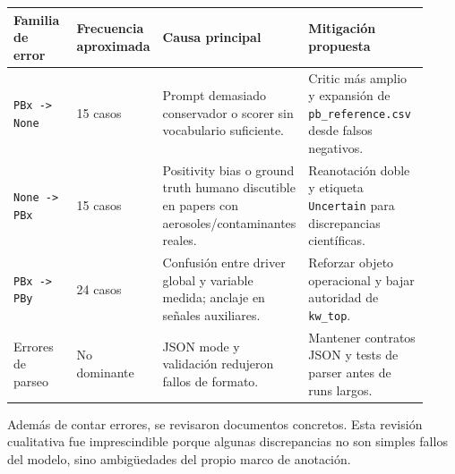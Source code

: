 \begin{center}
\scriptsize
\setlength{\tabcolsep}{4pt}
\renewcommand{\arraystretch}{1.18}
\begin{tabular}{p{0.18\linewidth}p{0.17\linewidth}p{0.25\linewidth}p{0.32\linewidth}}
\toprule
Familia de error & Frecuencia aproximada & Causa principal & Mitigación propuesta \\
\midrule
\texttt{PBx -> None} & 15 casos & Prompt demasiado conservador o scorer sin vocabulario suficiente. & Critic más amplio y expansión de \texttt{pb\_reference.csv} desde falsos negativos. \\
\texttt{None -> PBx} & 15 casos & Positivity bias o ground truth humano discutible en papers con aerosoles/contaminantes reales. & Reanotación doble y etiqueta \texttt{Uncertain} para discrepancias científicas. \\
\texttt{PBx -> PBy} & 24 casos & Confusión entre driver global y variable medida; anclaje en señales auxiliares. & Reforzar objeto operacional y bajar autoridad de \texttt{kw\_top}. \\
Errores de parseo & No dominante & JSON mode y validación redujeron fallos de formato. & Mantener contratos JSON y tests de parser antes de runs largos. \\
\bottomrule
\end{tabular}
\end{center}


Además de contar errores, se revisaron documentos concretos. Esta revisión cualitativa fue imprescindible porque algunas discrepancias no son simples fallos del modelo, sino ambigüedades del propio marco de anotación.

